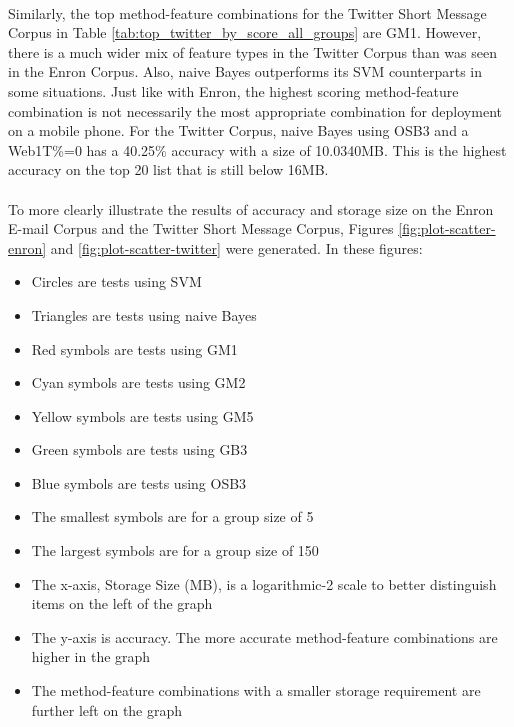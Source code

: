 \paragraph*{} Similarly, the top method-feature combinations for the Twitter Short Message Corpus in Table \ref{tab:top_twitter_by_score_all_groups} are GM1.  However, there is a much wider mix of feature types in the Twitter Corpus than was seen in the Enron Corpus.  Also, naive Bayes outperforms its SVM counterparts in some situations.  Just like with Enron, the highest scoring method-feature combination is not necessarily the most appropriate combination for deployment on a mobile phone.  For the Twitter Corpus, naive Bayes using OSB3 and a Web1T\%=0 has a 40.25\% accuracy with a size of 10.0340MB.  This is the highest accuracy on the top 20 list that is still below 16MB.  \begin{comment}There are several accuracies above 0.5 that have significantly smaller storage requirements.\end{comment}

\paragraph*{} To more clearly illustrate the results of accuracy and storage size on the Enron E-mail Corpus and the Twitter Short Message Corpus, Figures \ref{fig:plot-scatter-enron} and \ref{fig:plot-scatter-twitter} were generated.  In these figures:
	\begin{itemize}
		\item Circles are tests using SVM
		\item Triangles are tests using naive Bayes
		\item Red symbols are tests using GM1
		\item Cyan symbols are tests using GM2
		\item Yellow symbols are tests using GM5
		\item Green symbols are tests using GB3
		\item Blue symbols are tests using OSB3
		\item The smallest symbols are for a group size of 5
		\item The largest symbols are for a group size of 150
		\item The x-axis, Storage Size (MB), is a logarithmic-2 scale to better distinguish items on the left of the graph
		\item The y-axis is accuracy. The more accurate method-feature combinations are higher in the graph
		\item The method-feature combinations with a smaller storage requirement are further left on the graph
	\end{itemize}
		
